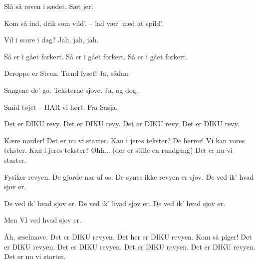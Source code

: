 \documentclass[10pt]{article}
\begin{document}
\begin{song}
                                        
                                        

{}  Slå så røven i sædet.
                Sæt jer!

                Kom så ind, drik som vild'.
                -- lad vær' med at spild'.

                Vil i score i dag?
     Jah, jah, jah.

  Så er i gået forkert.
                Så er i gået forkert.
                Så er i gået forkert.

                Deroppe er Steen.
                Tænd lyset!
                Ja, sådan.

                Sangene de' go.
                Teksterne sjove.
                Ja, og dog.

                Smid tøjet -- HAR vi hørt.
                Fra Sasja.

                Det er DIKU revy.
                Det er DIKU revy.
                Det er DIKU revy.
                Det er DIKU revy.

                Kære nørder!
             Det er nu vi starter.
  Kan i jeres tekster?
                De herrer!
             Vi kan vores tekster.
  Kan i jeres tekster?
             Øhh...
                \scene (der er stille en rundgang) 
             Det er nu vi starter.

\pagebreak
{}  Fysiker revyen.
                De gjorde nar af os.
                De synes ikke revyen er sjov.
                De ved ik' hvad sjov er.

                De ved ik' hvad sjov er.
                De ved ik' hvad sjov er.
                De ved ik' hvad sjov er.

    Men VI ved hvad sjov er.

  Åh, æselmave.
             Det er DIKU revyen.
  Det her er DIKU revyen.
                Kom så piger!
             Det er DIKU revyen.
  Det er DIKU revyen.
             Det er DIKU revyen.
  Det er DIKU revyen.
    Det er nu vi starter.

          \end{song}
        
\end{document}

